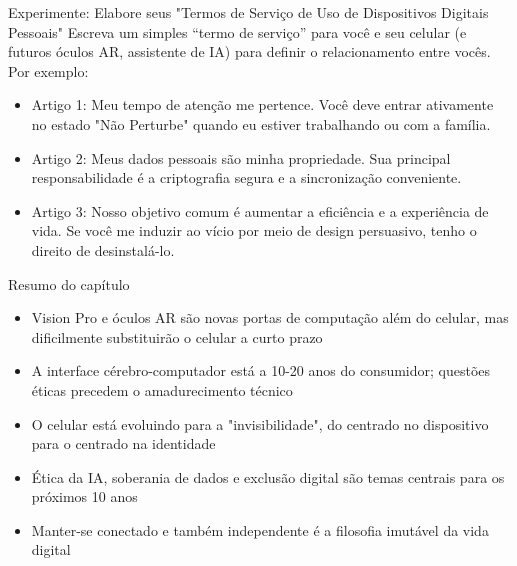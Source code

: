 \begin{tcbpractice}{Experimente: Elabore seus "Termos de Serviço de Uso de Dispositivos Digitais Pessoais"}
Escreva um simples “termo de serviço” para você e seu celular (e futuros óculos AR, assistente de IA) para definir o relacionamento entre vocês. Por exemplo:

\begin{itemize}
  \item Artigo 1: Meu tempo de atenção me pertence. Você deve entrar ativamente no estado "Não Perturbe" quando eu estiver trabalhando ou com a família.
  \item Artigo 2: Meus dados pessoais são minha propriedade. Sua principal responsabilidade é a criptografia segura e a sincronização conveniente.
  \item Artigo 3: Nosso objetivo comum é aumentar a eficiência e a experiência de vida. Se você me induzir ao vício por meio de design persuasivo, tenho o direito de desinstalá-lo.
\end{itemize}

\end{tcbpractice}

\begin{tcbsummary}{Resumo do capítulo}
\begin{itemize}
  \item Vision Pro e óculos AR são novas portas de computação além do celular, mas dificilmente substituirão o celular a curto prazo
  \item A interface cérebro-computador está a 10-20 anos do consumidor; questões éticas precedem o amadurecimento técnico
  \item O celular está evoluindo para a "invisibilidade", do centrado no dispositivo para o centrado na identidade
  \item Ética da IA, soberania de dados e exclusão digital são temas centrais para os próximos 10 anos
  \item Manter-se conectado e também independente é a filosofia imutável da vida digital
\end{itemize}

\end{tcbsummary}
